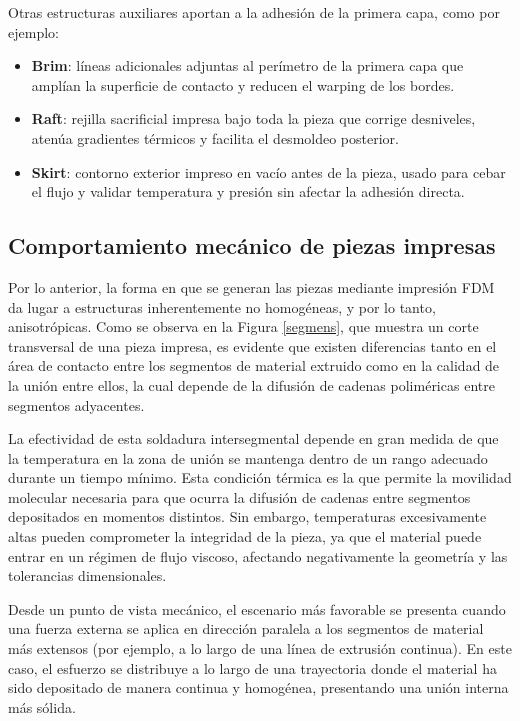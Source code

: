 Otras estructuras auxiliares aportan a la adhesión de la primera capa, como por ejemplo:

\begin{itemize}
  \item \textbf{Brim}: líneas adicionales adjuntas al perímetro de la primera capa que amplían la superficie de contacto y reducen el warping de los bordes.  
  \item \textbf{Raft}: rejilla sacrificial impresa bajo toda la pieza que corrige desniveles, atenúa gradientes térmicos y facilita el desmoldeo posterior.  
  \item \textbf{Skirt}: contorno exterior impreso en vacío antes de la pieza, usado para cebar el flujo y validar temperatura y presión sin afectar la adhesión directa.  
\end{itemize}

\subsection{Comportamiento mecánico de piezas impresas}

Por lo anterior, la forma en que se generan las piezas mediante impresión FDM da lugar a estructuras inherentemente no homogéneas, y por lo tanto, anisotrópicas. Como se observa en la Figura \ref{segmens}, que muestra un corte transversal de una pieza impresa, es evidente que existen diferencias tanto en el área de contacto entre los segmentos de material extruido como en la calidad de la unión entre ellos, la cual depende de la difusión de cadenas poliméricas entre segmentos adyacentes.

La efectividad de esta soldadura intersegmental depende en gran medida de que la temperatura en la zona de unión se mantenga dentro de un rango adecuado durante un tiempo mínimo. Esta condición térmica es la que permite la movilidad molecular necesaria para que ocurra la difusión de cadenas entre segmentos depositados en momentos distintos. Sin embargo, temperaturas excesivamente altas pueden comprometer la integridad de la pieza, ya que el material puede entrar en un régimen de flujo viscoso, afectando negativamente la geometría y las tolerancias dimensionales.

Desde un punto de vista mecánico, el escenario más favorable se presenta cuando una fuerza externa se aplica en dirección paralela a los segmentos de material más extensos (por ejemplo, a lo largo de una línea de extrusión continua). En este caso, el esfuerzo se distribuye a lo largo de una trayectoria donde el material ha sido depositado de manera continua y homogénea, presentando una unión interna más sólida.

